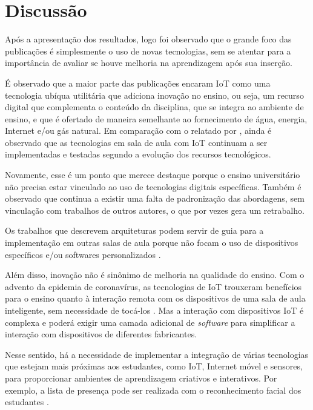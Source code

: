 \documentclass[portuguese]{textolivre}
\begin{document}
\section{Discussão}\label{sec-formato}
Após a apresentação dos resultados, logo foi observado que o grande foco das publicações é simplesmente o uso de novas tecnologias, sem se atentar para a importância de avaliar se houve melhoria na aprendizagem após sua inserção.

É observado que a maior parte das publicações encaram IoT como uma tecnologia ubíqua utilitária que adiciona inovação no ensino, ou seja, um recurso digital que complementa o conteúdo da disciplina, que se integra ao ambiente de ensino, e que é ofertado de maneira semelhante ao fornecimento de água, energia, Internet e/ou gás natural. Em comparação com o relatado por \textcite{lopes_smart_2018}, ainda é observado que as tecnologias em sala de aula com IoT continuam a ser implementadas e testadas segundo a evolução dos recursos tecnológicos. 

Novamente, esse é um ponto que merece destaque porque o ensino universitário não precisa estar vinculado ao uso de tecnologias digitais específicas. Também é observado que continua a existir uma falta de padronização das abordagens, sem vinculação com trabalhos de outros autores, o que por vezes gera um retrabalho. 

Os trabalhos que descrevem arquiteturas podem servir de guia para a implementação em outras salas de aula porque não focam o uso de dispositivos específicos e/ou softwares personalizados \cite{oteri_application_2020,nai_design_2022,liu_internet_2021,petrovic_designing_2021,chang_learning_2020}.

Além disso, inovação não é sinônimo de melhoria na qualidade do ensino. Com o advento da epidemia de coronavírus, as tecnologias de IoT trouxeram benefícios para o ensino quanto à interação remota com os dispositivos de uma sala de aula inteligente, sem necessidade de tocá-los \cite{mohammed_powerful_2021}. Mas a interação com dispositivos IoT é complexa e poderá exigir uma camada adicional de \textit{software} para simplificar a interação com dispositivos de diferentes fabricantes. 

Nesse sentido, há a necessidade de implementar a integração de várias tecnologias que estejam mais próximas aos estudantes, como IoT, Internet móvel e sensores, para proporcionar ambientes de aprendizagem criativos e interativos. Por exemplo, a lista de presença pode ser realizada com o reconhecimento facial dos estudantes \cite{shan_smart_2020}. 
\end{document}
